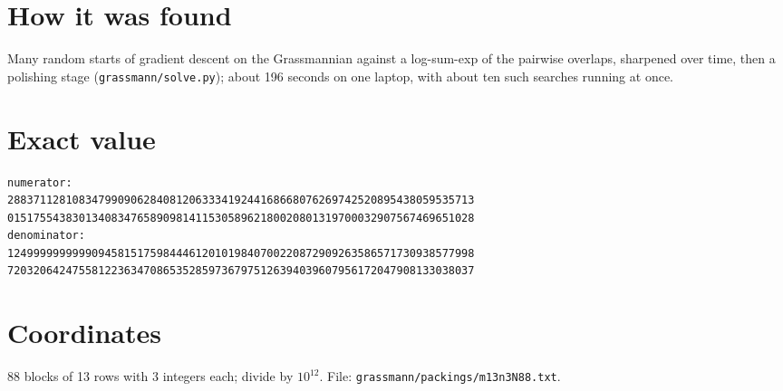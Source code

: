 \documentclass[11pt,a4paper]{article}
\begin{document}
\section{How it was found}
Many random starts of gradient descent on the Grassmannian against a log-sum-exp of the pairwise overlaps, sharpened over time, then a polishing stage (\texttt{grassmann/solve.py}); about 196 seconds on one laptop, with about ten such searches running at once.


\appendix
\section{Exact value}
{\small
\begin{verbatim}
numerator:
288371128108347990906284081206333419244168668076269742520895438059535713
015175543830134083476589098141153058962180020801319700032907567469651028
denominator:
124999999999909458151759844461201019840700220872909263586571730938577998
720320642475581223634708653528597367975126394039607956172047908133038037
\end{verbatim}}

\section{Coordinates}
88 blocks of 13 rows with 3 integers each; divide by $10^{12}$. File: \texttt{grassmann/packings/m13n3N88.txt}.
{\tiny
\begin{multicols}{3}
\end{multicols}}
\end{document}
